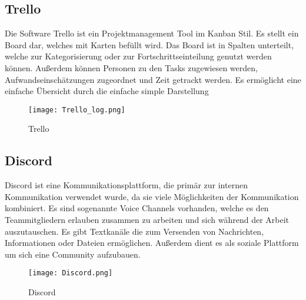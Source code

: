 \subsection{Trello}\label{subsec:Trello}
%
Die Software Trello ist ein Projektmanagement Tool im Kanban Stil. Es stellt ein Board dar, welches mit Karten befüllt wird.
Das Board ist in Spalten unterteilt, welche zur Kategorisierung oder zur Fortschrittseinteilung genutzt werden können.
Außerdem können Personen zu den Tasks zugewiesen werden, Aufwandseinschätzungen zugeordnet und Zeit getrackt werden.
Es ermöglicht eine einfache Übersicht durch die einfache simple Darstellung
\begin{figure}[H]
    \texttt{[image: Trello\_log.png]}
    \caption{Trello}
\end{figure}
%
\subsection{Discord}\label{subsec:Discord}
Discord ist eine Kommunikationsplattform, die primär zur internen Kommunikation verwendet wurde, da sie viele Möglichkeiten der Kommunikation kombiniert.
Es sind sogenannte Voice Channels vorhanden, welche es den Teammitgliedern erlauben zusammen zu arbeiten und sich während der Arbeit auszutauschen.
Es gibt Textkanäle die zum Versenden von Nachrichten, Informationen oder Dateien ermöglichen. Außerdem dient es als soziale Plattform um sich eine Community aufzubauen.

\begin{figure}[H] \texttt{[image: Discord.png]}\caption{Discord}
\end{figure}
%

\renewcommand{\kapitelautor}{}
